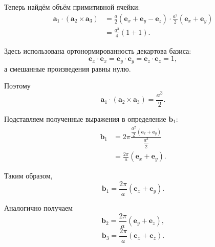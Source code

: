 \documentclass[../final.tex]{subfiles}
\begin{document}
Теперь найдём объём примитивной ячейки:
%
\begin{align*}
    \mathbf a_1\cdot
    (\mathbf a_2\times\mathbf a_3)
    &=
    \frac{a}{2}
    \left(
        \mathbf e_x+\mathbf e_y-\mathbf e_z
    \right)
    \cdot
    \frac{a^2}{2}
    \left(
        \mathbf e_x+\mathbf e_y
    \right)
    \\
    &=
    \frac{a^3}{4}
    (1+1).
\end{align*}

Здесь использована ортонормированность декартова базиса:
%
\begin{equation*}
    \mathbf e_x\cdot\mathbf e_x
    =
    \mathbf e_y\cdot\mathbf e_y
    =
    \mathbf e_z\cdot\mathbf e_z
    =
    1,
\end{equation*}
%
а смешанные произведения равны нулю.

Поэтому
%
\begin{equation*}
    \boxed{
        \mathbf a_1\cdot
        (\mathbf a_2\times\mathbf a_3)
        =
        \frac{a^3}{2}
    }.
\end{equation*}

Подставляем полученные выражения в определение $\mathbf b_1$:
%
\begin{align*}
    \mathbf b_1
    &=
    2\pi
    \frac{
        \dfrac{a^2}{2}
        (\mathbf e_x+\mathbf e_y)
    }{
        \dfrac{a^3}{2}
    }
    \\
    &=
    \frac{2\pi}{a}
    (\mathbf e_x+\mathbf e_y).
\end{align*}

Таким образом,
%
\begin{equation*}
    \boxed{
        \mathbf b_1
        =
        \frac{2\pi}{a}
        \left(
            \mathbf e_x+\mathbf e_y
        \right)
    }.
\end{equation*}

Аналогично получаем
%
\begin{equation*}
    \boxed{
        \mathbf b_2
        =
        \frac{2\pi}{a}
        \left(
            \mathbf e_y+\mathbf e_z
        \right)
    },
\end{equation*}
%
\begin{equation*}
    \boxed{
        \mathbf b_3
        =
        \frac{2\pi}{a}
        \left(
            \mathbf e_x+\mathbf e_z
        \right)
    }.
\end{equation*}


\end{document}
